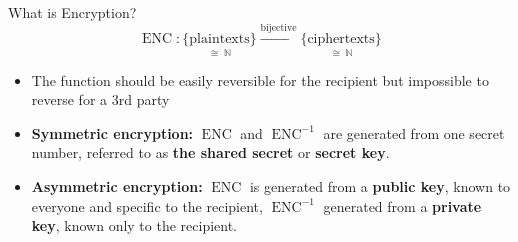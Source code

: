\documentclass{beamer}
\begin{document}
	\begin{frame}{What is Encryption?} %
		\begin{equation}
			\operatorname{ENC}: \underset{\cong\;\mathbb{N}}{\{\text{plaintexts}\}}
						\overset{\text{bijective}}{\longrightarrow}
						\underset{\cong\;\mathbb{N}}{\{\text{ciphertexts}\}}
						\nonumber
		\end{equation}
		\begin{itemize}
			\item The function should be easily reversible for the
			recipient but impossible to reverse for a 3rd party

 			\item \textbf{Symmetric encryption:} $\operatorname{ENC}$
 			and $\operatorname{ENC}^{-1}$ are generated from one secret
 			number, referred to as \textbf{the shared secret} or
 			\textbf{secret key}.

 			\item \textbf{Asymmetric encryption:} $\operatorname{ENC}$
 			is generated from a \textbf{public key}, known to everyone
 			and specific to the recipient, $\operatorname{ENC}^{-1}$
 			generated from a \textbf{private key}, known only to the
 			recipient.

		\end{itemize}
	\end{frame}
\end{document}
